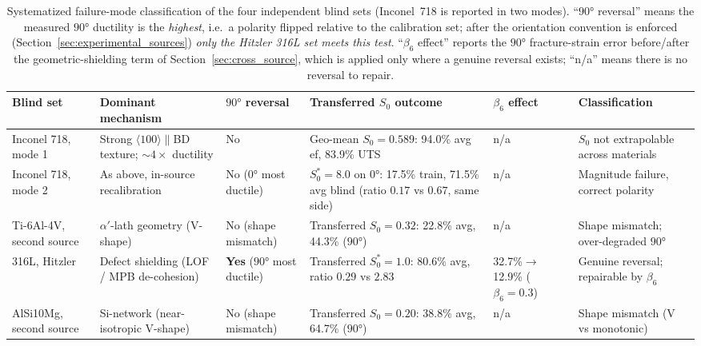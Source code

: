 \documentclass[twocolumn]{sagej}
\begin{document}
\begin{table}[htbp]
\centering
\caption{Systematized failure-mode classification of the four independent blind sets (Inconel~718 is reported in two modes). ``$\ang{90}$ reversal'' means the measured $\ang{90}$ ductility is the \emph{highest}, i.e.\ a polarity flipped relative to the calibration set; after the orientation convention is enforced (Section~\ref{sec:experimental_sources}) \emph{only the Hitzler 316L set meets this test}. ``$\beta_6$ effect'' reports the $\ang{90}$ fracture-strain error before/after the geometric-shielding term of Section~\ref{sec:cross_source}, which is applied only where a genuine reversal exists; ``n/a'' means there is no reversal to repair.}
\label{tab:blind_failures}
\footnotesize
\setlength{\tabcolsep}{3pt}
\begin{tabular}{p{2.2cm}p{2.5cm}p{1.35cm}p{3.2cm}p{2.1cm}p{3.0cm}}
\toprule
\textbf{Blind set} & \textbf{Dominant mechanism} & \textbf{$\ang{90}$ reversal} & \textbf{Transferred $S_0$ outcome} & \textbf{$\beta_6$ effect} & \textbf{Classification} \\
\midrule
Inconel 718, mode 1 \cite{hovig2018in718} & Strong $\langle100\rangle\parallel$BD texture; $\sim4\times$ ductility & No & Geo-mean $S_0=0.589$: 94.0\% avg ef, 83.9\% UTS & n/a & $S_0$ not extrapolable across materials \\
Inconel 718, mode 2 \cite{hovig2018in718} & As above, in-source recalibration & No ($\ang{0}$ most ductile) & $S_0^*=8.0$ on $\ang{0}$: 17.5\% train, 71.5\% avg blind (ratio $0.17$ vs $0.67$, same side) & n/a & Magnitude failure, correct polarity \\
Ti-6Al-4V, second source \cite{sun2024ti64adem} & $\alpha'$-lath geometry (V-shape) & No (shape mismatch) & Transferred $S_0=0.32$: 22.8\% avg, 44.3\% ($\ang{90}$) & n/a & Shape mismatch; over-degraded $\ang{90}$ \\
316L, Hitzler \cite{hitzler2017materials} & Defect shielding (LOF / MPB de-cohesion) & \textbf{Yes} ($\ang{90}$ most ductile) & Transferred $S_0^*=1.0$: 80.6\% avg, ratio $0.29$ vs $2.83$ & 32.7\%$\to$12.9\% ($\beta_6{=}0.3$) & Genuine reversal; repairable by $\beta_6$ \\
AlSi10Mg, second source \cite{metals2018alsi_aniso} & Si-network (near-isotropic V-shape) & No (shape mismatch) & Transferred $S_0=0.20$: 38.8\% avg, 64.7\% ($\ang{90}$) & n/a & Shape mismatch (V vs monotonic) \\
\bottomrule
\end{tabular}
\end{table}
\end{document}

